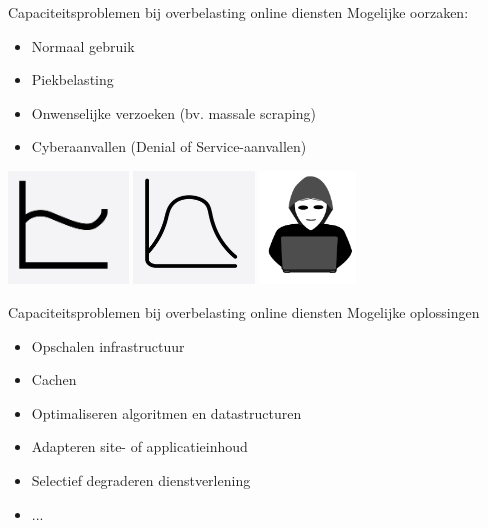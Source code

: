 \documentclass{beamer}
\begin{document}
\begin{frame}{Capaciteitsproblemen bij overbelasting online diensten}
    Mogelijke oorzaken:
    \begin{itemize}
        \item Normaal gebruik
        \item Piekbelasting
        \item Onwenselijke verzoeken (bv. massale scraping)
        \item Cyberaanvallen (Denial of Service-aanvallen)
    \end{itemize}
    \begin{center}
        \includegraphics[height = 3cm]{fluctuaties.png}
        \includegraphics[height = 3cm]{piek.png}
        \includegraphics[height = 3cm]{hacker.png}        
    \end{center}
\end{frame}


\begin{frame}{Capaciteitsproblemen bij overbelasting online diensten}
    Mogelijke oplossingen
    \begin{itemize}
        \item Opschalen infrastructuur
        \item Cachen
        \item Optimaliseren algoritmen en datastructuren
        \item Adapteren site- of applicatieinhoud
        \item Selectief degraderen dienstverlening
        \item ...
    \end{itemize}
\end{frame}
\end{document}

